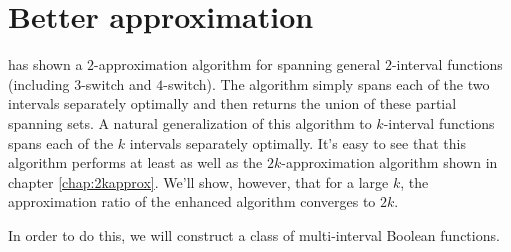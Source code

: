 \chapter{Better approximation}

\dubovsky{} has shown a $2$-approximation algorithm
for spanning general $2$-interval functions
(including $3$-switch and $4$-switch).\cite[p.~33]{Dubovsky2012}
The algorithm simply spans each of the two intervals
separately optimally and then returns the union
of these partial spanning sets.
A natural generalization of this algorithm to $k$-interval
functions spans each of the $k$ intervals separately
optimally.
It's easy to see that this algorithm performs
at least as well as the $2k$-approximation algorithm
shown in chapter \ref{chap:2kapprox}.
We'll show, however,
that for a large $k$,
the approximation ratio of the enhanced algorithm
converges to $2k$.

In order to do this,
we will construct a class of  multi-interval
Boolean functions.


